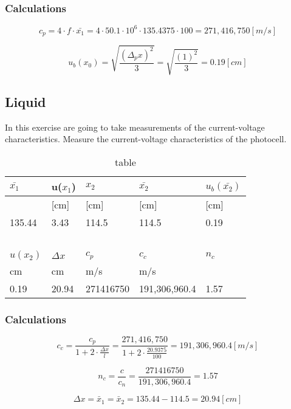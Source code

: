 \subsubsection*{Calculations }

\begin{equation}
	c_p = 4 \cdot f \cdot \bar{x_1} = 4 \cdot 50.1 \cdot 10^6 \cdot 135.4375 \cdot 100
	 =271,416,750 [m/s]
\end{equation}

\begin{equation}
	u_b(x_0)=\sqrt{\frac{\left(\Delta_px\right)^2}{3}} = 
	\sqrt{\frac{\left(1\right)^2}{3}} = 0.19[cm]
\end{equation}







\subsection{Liquid}

In this exercise are going to take measurements of the current-voltage characteristics.
Measure the current-voltage characteristics of the photocell.

\begin{table}[H]
    \centering
    \begin{tabular}{l|l|l|l|l}
    
        $\bar{x_1}$ & u($x_1$) & $x_2$ & $\bar{x_2}$ & $u_b(\bar{x_2})$ \\ \hline
        [m] & [cm] & [cm] & [cm] & [cm] \\ \hline
        135.44 & 3.43 & 114.5 & 114.5 & 0.19 \\ \hline
        ~ & ~ & ~ & ~ & ~ \\ \hline
        $u(x_2)$ & $\Delta x$ & $c_p$ & $c_c$ & $n_c$ \\ \hline
        cm & cm & m/s & m/s & ~ \\ \hline
        0.19 & 20.94 & 271416750 & 191,306,960.4 & 1.57 \\ \hline
    \end{tabular}
    \caption{table}
\end{table}

\subsubsection*{Calculations }
\begin{equation}
	c_c=\frac{c_p}{1+2\cdot \frac{\Delta x}{l}} = 
	\frac{271,416,750}{1+2\cdot \frac{20.9375}{100}} = 191,306,960.4 [m/s]
\end{equation}

\begin{equation}
	n_c = \frac{c}{ c_n} = \frac{271416750}{191,306,960.4} = 1.57
\end{equation}

\begin{equation}
	\Delta x = \bar x_1 = \bar x_2 = 135.44 - 114.5 = 20.94 [cm]
\end{equation}







